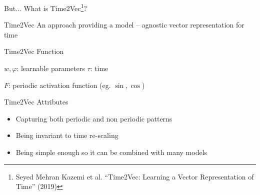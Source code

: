 \documentclass[compress, mathserif, fleqn, 10pt]{beamer}
\begin{document}
	\begin{frame}{But... What is Time2Vec\footnote[1]{Seyed Mehran Kazemi et al. “Time2Vec: Learning a Vector Representation of
				Time” (2019)}?}
		
		\begin{block}{Time2Vec}
			An approach providing a model – agnostic vector representation for time
		\end{block}
		
		\begin{block}{Time2Vec Function}
			
			\smallskip
			
			$w, \varphi$: learnable parameters \space $\tau$: time
			
			$F$: periodic activation function (eg. $\sin, \cos$)
		\end{block}
		
		\begin{block}{Time2Vec Attributes}
			\begin{itemize}
				\item Capturing both periodic and non periodic patterns
				
				\item Being invariant to time re-scaling
				
				\item Being simple enough so it can be combined with many models
			\end{itemize}
		\end{block}
	\end{frame}
	
\end{document}
